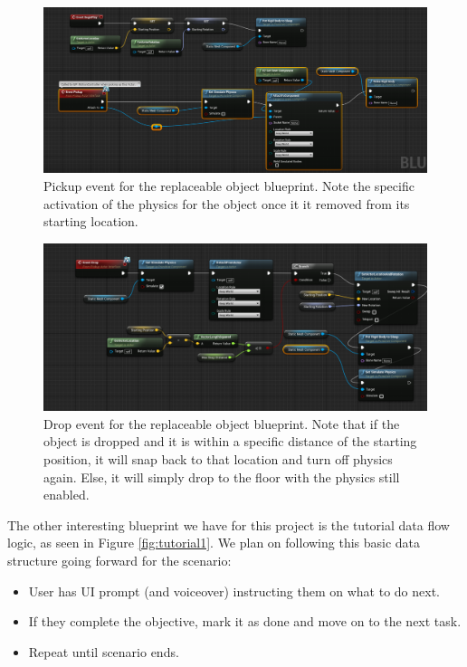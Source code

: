 \documentclass[onecolumn, draftclsnofoot,10pt, compsoc]{IEEEtran}
\begin{document}
\begin{figure}[ht!]
    \centering
    \includegraphics[scale=0.4]{pickup_bp1.png}
    \caption{Pickup event for the replaceable object blueprint. Note the specific activation of the physics for the object once it it removed from its starting location.}
    \label{fig:pickup1}
\end{figure}

\begin{figure}[ht!]
    \centering
    \includegraphics[scale=0.4]{pickup_bp2.png}
    \caption{Drop event for the replaceable object blueprint. Note that if the object is dropped and it is within a specific distance of the starting position, it will snap back to that location and turn off physics again. Else, it will simply drop to the floor with the physics still enabled.}
    \label{fig:pickup2}
\end{figure}

\newpage

The other interesting blueprint we have for this project is the tutorial data flow logic, as seen in Figure \ref{fig:tutorial1}. We plan on following this basic data structure going forward for the scenario:
\begin{itemize}
    \item User has UI prompt (and voiceover) instructing them on what to do next.
    \item If they complete the objective, mark it as done and move on to the next task.
    \item Repeat until scenario ends.
\end{itemize}
\end{document}
